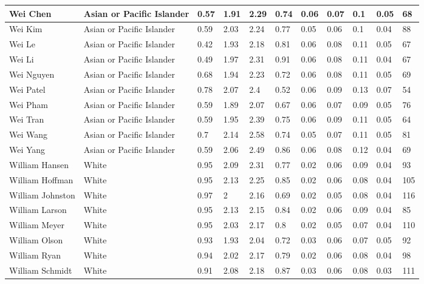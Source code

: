 \begin{table}[!ht]
\begin{tabular}{|l|l|l|l|l|l|l|l|l|l|l|}
        Wei Chen & Asian or Pacific Islander & 0.57 & 1.91 & 2.29 & 0.74 & 0.06 & 0.07 & 0.1 & 0.05 & 68 \\ \hline
        Wei Kim & Asian or Pacific Islander & 0.59 & 2.03 & 2.24 & 0.77 & 0.05 & 0.06 & 0.1 & 0.04 & 88 \\ \hline
        Wei Le & Asian or Pacific Islander & 0.42 & 1.93 & 2.18 & 0.81 & 0.06 & 0.08 & 0.11 & 0.05 & 67 \\ \hline
        Wei Li & Asian or Pacific Islander & 0.49 & 1.97 & 2.31 & 0.91 & 0.06 & 0.08 & 0.11 & 0.04 & 67 \\ \hline
        Wei Nguyen & Asian or Pacific Islander & 0.68 & 1.94 & 2.23 & 0.72 & 0.06 & 0.08 & 0.11 & 0.05 & 69 \\ \hline
        Wei Patel & Asian or Pacific Islander & 0.78 & 2.07 & 2.4 & 0.52 & 0.06 & 0.09 & 0.13 & 0.07 & 54 \\ \hline
        Wei Pham & Asian or Pacific Islander & 0.59 & 1.89 & 2.07 & 0.67 & 0.06 & 0.07 & 0.09 & 0.05 & 76 \\ \hline
        Wei Tran & Asian or Pacific Islander & 0.59 & 1.95 & 2.39 & 0.75 & 0.06 & 0.09 & 0.11 & 0.05 & 64 \\ \hline
        Wei Wang & Asian or Pacific Islander & 0.7 & 2.14 & 2.58 & 0.74 & 0.05 & 0.07 & 0.11 & 0.05 & 81 \\ \hline
        Wei Yang & Asian or Pacific Islander & 0.59 & 2.06 & 2.49 & 0.86 & 0.06 & 0.08 & 0.12 & 0.04 & 69 \\ \hline
        William Hansen & White & 0.95 & 2.09 & 2.31 & 0.77 & 0.02 & 0.06 & 0.09 & 0.04 & 93 \\ \hline
        William Hoffman & White & 0.95 & 2.13 & 2.25 & 0.85 & 0.02 & 0.06 & 0.08 & 0.04 & 105 \\ \hline
        William Johnston & White & 0.97 & 2 & 2.16 & 0.69 & 0.02 & 0.05 & 0.08 & 0.04 & 116 \\ \hline
        William Larson & White & 0.95 & 2.13 & 2.15 & 0.84 & 0.02 & 0.06 & 0.09 & 0.04 & 85 \\ \hline
        William Meyer & White & 0.95 & 2.03 & 2.17 & 0.8 & 0.02 & 0.05 & 0.07 & 0.04 & 110 \\ \hline
        William Olson & White & 0.93 & 1.93 & 2.04 & 0.72 & 0.03 & 0.06 & 0.07 & 0.05 & 92 \\ \hline
        William Ryan & White & 0.94 & 2.02 & 2.17 & 0.79 & 0.02 & 0.06 & 0.08 & 0.04 & 98 \\ \hline
        William Schmidt & White & 0.91 & 2.08 & 2.18 & 0.87 & 0.03 & 0.06 & 0.08 & 0.03 & 111 \\ \hline

\end{tabular}
\end{table}
